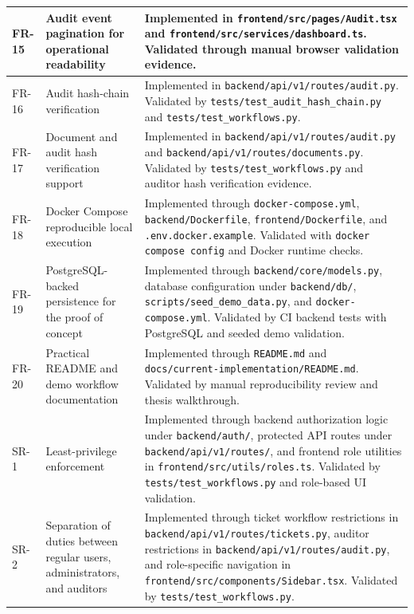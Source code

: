 \documentclass[12pt,a4paper]{report}
\begin{document}
\begin{longtable}{|p{1.1cm}|p{5.0cm}|p{9.0cm}|}
FR-15 & Audit event pagination for operational readability &
Implemented in \texttt{frontend/src/pages/Audit.tsx} and \texttt{frontend/src/services/dashboard.ts}. Validated through manual browser validation evidence. \\
\hline

FR-16 & Audit hash-chain verification &
Implemented in \texttt{backend/api/v1/routes/audit.py}. Validated by \texttt{tests/test\_audit\_hash\_chain.py} and \texttt{tests/test\_workflows.py}. \\
\hline

FR-17 & Document and audit hash verification support &
Implemented in \texttt{backend/api/v1/routes/audit.py} and \texttt{backend/api/v1/routes/documents.py}. Validated by \texttt{tests/test\_workflows.py} and auditor hash verification evidence. \\
\hline

FR-18 & Docker Compose reproducible local execution &
Implemented through \texttt{docker-compose.yml}, \texttt{backend/Dockerfile}, \texttt{frontend/Dockerfile}, and \texttt{.env.docker.example}. Validated with \texttt{docker compose config} and Docker runtime checks. \\
\hline

FR-19 & PostgreSQL-backed persistence for the proof of concept &
Implemented through \texttt{backend/core/models.py}, database configuration under \texttt{backend/db/}, \texttt{scripts/seed\_demo\_data.py}, and \texttt{docker-compose.yml}. Validated by CI backend tests with PostgreSQL and seeded demo validation. \\
\hline

FR-20 & Practical README and demo workflow documentation &
Implemented through \texttt{README.md} and \texttt{docs/current-implementation/README.md}. Validated by manual reproducibility review and thesis walkthrough. \\
\hline

SR-1 & Least-privilege enforcement &
Implemented through backend authorization logic under \texttt{backend/auth/}, protected API routes under \texttt{backend/api/v1/routes/}, and frontend role utilities in \texttt{frontend/src/utils/roles.ts}. Validated by \texttt{tests/test\_workflows.py} and role-based UI validation. \\
\hline

SR-2 & Separation of duties between regular users, administrators, and auditors &
Implemented through ticket workflow restrictions in \texttt{backend/api/v1/routes/tickets.py}, auditor restrictions in \texttt{backend/api/v1/routes/audit.py}, and role-specific navigation in \texttt{frontend/src/components/Sidebar.tsx}. Validated by \texttt{tests/test\_workflows.py}. \\
\hline


\end{longtable}
\end{document}
